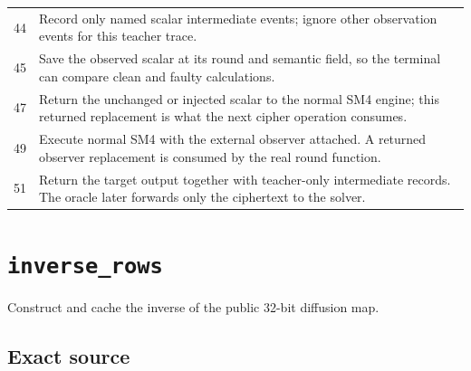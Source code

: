 \begin{longtable}{r >{\raggedright\arraybackslash}p{138mm}}
44&Record only named scalar intermediate events; ignore other observation events for this teacher trace.\\
45&Save the observed scalar at its round and semantic field, so the terminal can compare clean and faulty calculations.\\
47&Return the unchanged or injected scalar to the normal SM4 engine; this returned replacement is what the next cipher operation consumes.\\
49&Execute normal SM4 with the external observer attached. A returned observer replacement is consumed by the real round function.\\
51&Return the target output together with teacher-only intermediate records. The oracle later forwards only the ciphertext to the solver.\\
\bottomrule\end{longtable}\endgroup
\section{\texttt{inverse\_rows}}
Construct and cache the inverse of the public 32-bit diffusion map.
\begin{center}\end{center}
\subsection*{Exact source}
